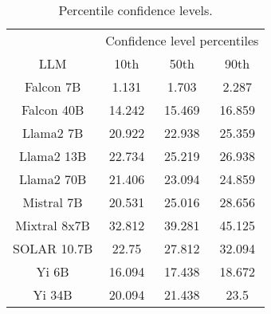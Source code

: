 \begin{table*}
\centering
\begin{tabular}{c|c|c|c}
& \multicolumn{3}{c}{Confidence level percentiles} \\ 
LLM & 10th & 50th & 90th\\ \hline
Falcon 7B & 1.131 & 1.703 & 2.287\\
Falcon 40B & 14.242 & 15.469 & 16.859\\
Llama2 7B & 20.922 & 22.938 & 25.359\\
Llama2 13B & 22.734 & 25.219 & 26.938\\
Llama2 70B & 21.406 & 23.094 & 24.859\\
Mistral 7B & 20.531 & 25.016 & 28.656\\
Mixtral 8x7B & 32.812 & 39.281 & 45.125\\
SOLAR 10.7B & 22.75 & 27.812 & 32.094\\
Yi 6B & 16.094 & 17.438 & 18.672\\
Yi 34B & 20.094 & 21.438 & 23.5\\
\hline
\end{tabular}
\caption{Percentile confidence levels.}
\label{tab:percentile_conf}
\end{table*}
